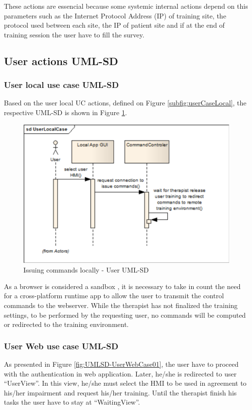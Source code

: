 These actions are essencial because some systemic internal actions depend on this parameters such as the Internet Protocol Address (IP) of training site, the protocol used between each site, the IP of patient site and if at the end of training session the user have to fill the survey.


\subsection{User actions UML-SD}
\subsubsection{User local use case UML-SD}

Based on the user local UC actions, defined on Figure \ref{subfig:userCaseLocal},  the respective UML-SD is shown in Figure \ref{fig:UMLSD-UserLocalCase}.

\begin{figure}[!hbt]
\begin{center}
\includegraphics[width=0.5 \textwidth]{img/cap4/UMLSD-UserLocalCase}
\caption{Issuing commands locally  - User UML-SD}
\label{fig:UMLSD-UserLocalCase}
\end{center}
\end{figure} 

As a browser is considered a sandbox \cite{quong2020}, it is necessary to take in count the need for a cross-platform runtime app to allow the user to transmit the control commands to the webserver. While the therapist has not finalized the training settings, to be performed by the requesting user, no commands will be computed or redirected to the training environment.


\subsubsection{User Web use case UML-SD}

As presented in Figure \ref{fig:UMLSD-UserWebCase01}, the user have to proceed with the authentication in web application. Later, he/she is redirected to user ``UserView''. In this view, he/she must select the HMI to be used in agreement to his/her impairment and request his/her training. Until the therapist finish his tasks the user have to stay at ``WaitingView''.

